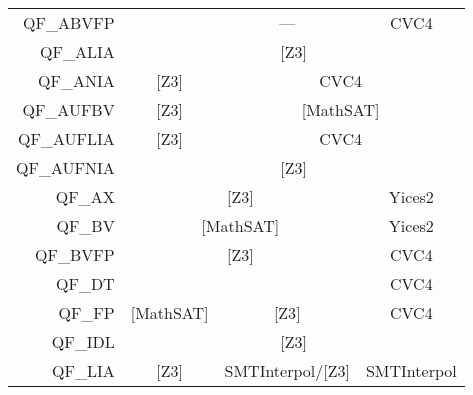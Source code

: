 \begin{table}
{\begin{tabular}{rccc}
    QF\_ABVFP                        &                                   & \multicolumn{1}{|c|}{---}                 & \multicolumn{1}{|c|}{CVC4}        \\ \cline{2-4} 
    \multicolumn{1}{r|}{QF\_ALIA}   & \multicolumn{3}{c|}{{[}Z3{]}}                                                                                     \\ \cline{2-4} 
    \multicolumn{1}{r|}{QF\_ANIA}   & \multicolumn{1}{c|}{{[}Z3{]}}      & \multicolumn{2}{c|}{CVC4}                                                    \\ \cline{2-4} 
    \multicolumn{1}{r|}{QF\_AUFBV}  & \multicolumn{1}{c|}{{[}Z3{]}}      & \multicolumn{2}{c|}{{[}MathSAT{]}}                                           \\ \cline{2-4} 
    \multicolumn{1}{r|}{QF\_AUFLIA} & \multicolumn{1}{c|}{{[}Z3{]}}      & \multicolumn{2}{c|}{CVC4}                                                    \\ \cline{2-4} 
    \multicolumn{1}{r|}{QF\_AUFNIA} & \multicolumn{3}{c|}{{[}Z3{]}}                                                                                     \\ \cline{2-4} 
    \multicolumn{1}{r|}{QF\_AX}     & \multicolumn{2}{c|}{{[}Z3{]}}                                                  & \multicolumn{1}{c|}{Yices2}      \\ \cline{2-4} 
    \multicolumn{1}{r|}{QF\_BV}     & \multicolumn{2}{c|}{{[}MathSAT{]}}                                             & \multicolumn{1}{c|}{Yices2}      \\ \cline{2-4} 
    \multicolumn{1}{r|}{QF\_BVFP}   & \multicolumn{2}{c|}{{[}Z3{]}}                                                  & \multicolumn{1}{c|}{CVC4}        \\ \cline{2-4} 
    QF\_DT                           &                                    &                                           & \multicolumn{1}{|c|}{CVC4}       \\ \cline{2-4} 
    \multicolumn{1}{r|}{QF\_FP}     & \multicolumn{1}{c|}{{[}MathSAT{]}} & \multicolumn{1}{c|}{{[}Z3{]}}             & \multicolumn{1}{c|}{CVC4}        \\ \cline{2-4} 
    \multicolumn{1}{r|}{QF\_IDL}    & \multicolumn{3}{c|}{{[}Z3{]}}                                                                                     \\ \cline{2-4} 
    \multicolumn{1}{r|}{QF\_LIA}    & \multicolumn{1}{c|}{{[}Z3{]}}      & \multicolumn{1}{c|}{SMTInterpol/{[}Z3{]}} & \multicolumn{1}{c|}{SMTInterpol} \\ \cline{2-4} 

\end{tabular}}
\end{table}

